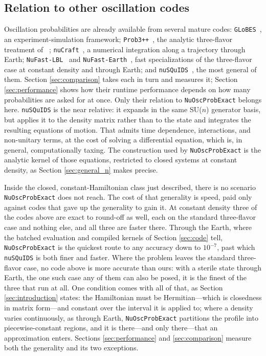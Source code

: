 \documentclass[final,5p,times,twocolumn,sort,compress]{elsarticle}
\providecommand{\Ref}{}
\begin{document}

\subsection{Relation to other oscillation codes}

Oscillation probabilities are already available from several mature codes: {\tt GLoBES}\ \cite{GLoBES}, an experiment-simulation framework; {\tt Prob3++}\ \cite{Prob3pp}, the analytic three-flavor treatment of \Ref\ \cite{Barger:1980tf}; {\tt nuCraft}\ \cite{nuCraft}, a numerical integration along a trajectory through Earth; {\tt NuFast-LBL}\ \cite{Denton:2024pzc} and {\tt NuFast-Earth}\ \cite{Denton:2025oxf}, fast specializations of the three-flavor case at constant density and through Earth; and {\tt nuSQuIDS}\ \cite{Delgado:2014kpa, NuSQuIDS}, the most general of them.  Section \ref{sec:comparison} takes each in turn and measures it; Section \ref{sec:performance} shows how their runtime performance depends on how many probabilities are asked for at once.  Only their relation to {\tt NuOscProbExact} belongs here.  {\tt nuSQuIDS} is the near relative: it expands in the same SU($n$) generator basis, but applies it to the density matrix rather than to the state and integrates the resulting equations of motion.  That admits time dependence, interactions, and non-unitary terms, at the cost of solving a differential equation, which is, in general, computationally taxing.  The construction used by {\tt NuOscProbExact} is the analytic kernel of those equations, restricted to closed systems at constant density, as Section \ref{sec:general_n} makes precise.

Inside the closed, constant-Hamiltonian class just described, there is no scenario {\tt NuOscProbExact} does not reach.  The cost of that generality is speed, paid only against codes that gave up the generality to gain it.  At constant density three of the codes above are exact to round-off as well, each on the standard three-flavor case and nothing else, and all three are faster there.  Through the Earth, where the batched evaluation and compiled kernels of Section \ref{sec:code} tell, {\tt NuOscProbExact} is the quickest route to any accuracy down to $10^{-7}$, past which {\tt nuSQuIDS} is both finer and faster.  Where the problem leaves the standard three-flavor case, no code above is more accurate than ours: with a sterile state through Earth, the one such case any of them can also be posed, it is the finest of the three that run at all.  One condition comes with all of that, as Section \ref{sec:introduction} states: the Hamiltonian must be Hermitian---which is closedness in matrix form---and constant over the interval it is applied to; where a density varies continuously, as through Earth, {\tt NuOscProbExact} partitions the profile into piecewise-constant regions, and it is there---and only there---that an approximation enters.  Sections \ref{sec:performance} and \ref{sec:comparison} measure both the generality and its two exceptions.
\end{document}
